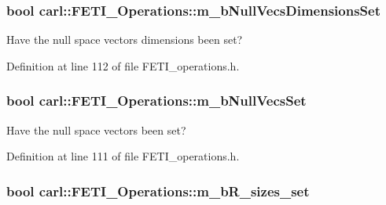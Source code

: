 \subsubsection[{m\+\_\+b\+Null\+Vecs\+Dimensions\+Set}]{\setlength{\rightskip}{0pt plus 5cm}bool carl\+::\+F\+E\+T\+I\+\_\+\+Operations\+::m\+\_\+b\+Null\+Vecs\+Dimensions\+Set\hspace{0.3cm}{\ttfamily [protected]}}\label{classcarl_1_1_f_e_t_i___operations_afd921550a2e18db731f244ea40688477}


Have the null space vectors\textquotesingle{} dimensions been set? 



Definition at line 112 of file F\+E\+T\+I\+\_\+operations.\+h.

\hypertarget{classcarl_1_1_f_e_t_i___operations_a96f6ef39dd083e2f659cc0be7e35ff19}{}
\subsubsection[{m\+\_\+b\+Null\+Vecs\+Set}]{\setlength{\rightskip}{0pt plus 5cm}bool carl\+::\+F\+E\+T\+I\+\_\+\+Operations\+::m\+\_\+b\+Null\+Vecs\+Set\hspace{0.3cm}{\ttfamily [protected]}}\label{classcarl_1_1_f_e_t_i___operations_a96f6ef39dd083e2f659cc0be7e35ff19}


Have the null space vectors been set? 



Definition at line 111 of file F\+E\+T\+I\+\_\+operations.\+h.

\hypertarget{classcarl_1_1_f_e_t_i___operations_a353b1739899d3d0260b97132603dbe02}{}
\subsubsection[{m\+\_\+b\+R\+\_\+sizes\+\_\+set}]{\setlength{\rightskip}{0pt plus 5cm}bool carl\+::\+F\+E\+T\+I\+\_\+\+Operations\+::m\+\_\+b\+R\+\_\+sizes\+\_\+set\hspace{0.3cm}{\ttfamily [protected]}}\label{classcarl_1_1_f_e_t_i___operations_a353b1739899d3d0260b97132603dbe02}


